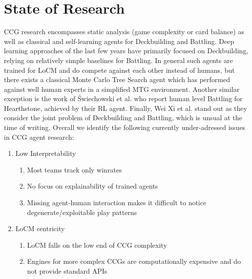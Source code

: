\documentclass[
	english,%
	accentcolor=9c,%
	type=intern, %
	marginpar=false,%
]{tudapub}
\begin{document}
\section{State of Research}
CCG research encompasses static analysis (game complexity or card balance) as well as classical and self-learning agents for Deckbuilding and Battling.
Deep learning approaches of the last few years have primarily focused on Deckbuilding, relying on relatively simple baselines for Battling.
In general such agents are trained for LoCM and do compete against each other instead of humans,
but there exists a classical Monte Carlo Tree Search agent\cite{2012ClassicalMcts} which has performed against well human experts in a simplified MTG environment. 
Another similar exception is the work of {\'S}wiechowski et al.\cite{2018DeepSupervisedMcts} who report human level Battling for Hearthstone, achieved by their RL agent.
Finally, Wei Xi et al.\cite{2023ByteRL} stand out as they consider the joint problem of Deckbuilding and Battling, which is unsual at the time of writing.
Overall we identify the following currently under-adressed issues in CCG agent research:
\begin{enumerate}
    \item Low Interpretability 
    \begin{enumerate}
        \item Most teams track only winrates
        \item No focus on explainability of trained agents
        \item Missing agent-human interaction makes it difficult to notice degenerate/exploitable play patterns\cite{2024ExploitingByteRL}
    \end{enumerate}
    \item LoCM centricity
    \begin{enumerate}
        \item LoCM falls on the low end of CCG complexity\cite{2024Taxonomy}
        \item Engines for more complex CCGs are computationally expensive and do not provide standard APIs
    \end{enumerate}
\end{enumerate}
\end{document}
